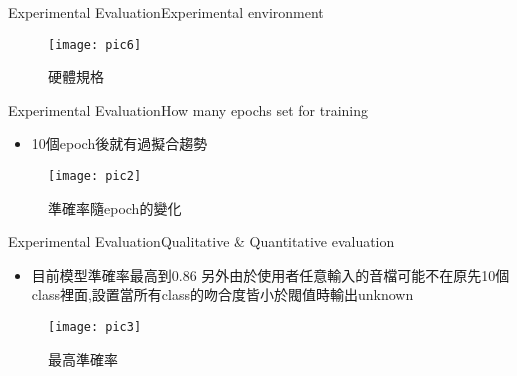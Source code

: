 \documentclass{beamer}
\begin{document}
\begin{CJK}{UTF8}{bsmi}
\begin{frame}{Experimental Evaluation}{Experimental environment}
\begin{figure}[H] %
\texttt{[image: pic6]} %
\caption{硬體規格} %
\end{figure}
\end{frame}
\begin{frame}{Experimental Evaluation}{How many epochs set for training}
  \begin{itemize}
  \item {
    10個epoch後就有過擬合趨勢
  }
  \end{itemize}

\begin{figure}[H] %
\texttt{[image: pic2]} %
\caption{準確率隨epoch的變化} %
\end{figure}



\end{frame}
\begin{frame}{Experimental Evaluation}{Qualitative \& Quantitative evaluation}
  \begin{itemize}
  \item {
    目前模型準確率最高到0.86 
另外由於使用者任意輸入的音檔可能不在原先10個class裡面,設置當所有class的吻合度皆小於閥值時輸出unknown
  }
  \end{itemize}

\begin{figure}[H] %
\texttt{[image: pic3]} %
\caption{最高準確率} %
\end{figure}



\end{frame}
\end{CJK}
\end{document}
